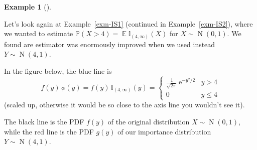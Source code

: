 \documentclass[
  letterpaper,
  DIV=11,
  numbers=noendperiod]{scrreprt}
\newcommand{\Exg}{\operatorname{\mathbb{E}}}
\newcommand{\Ind}{\mathbb{I}}
\theoremstyle{plain}
\theoremstyle{definition}
\theoremstyle{definition}
\newtheorem{example}{Example}[chapter]
\theoremstyle{remark}
\begin{document}
\begin{example}[]\protect\hypertarget{exm-IS3}{}\label{exm-IS3}

Let's look again at Example~\ref{exm-IS1} (continued in
Example~\ref{exm-IS2}), where we wanted to estimate
\(\mathbb P(X > 4) = \Exg\Ind_{(4,\infty)}(X)\) for
\(X \sim \operatorname{N}(0,1)\). We found are estimator was enormously
improved when we used instead \(Y \sim \operatorname{N}(4,1)\).

In the figure below, the blue line is
\[f(y)\,\phi(y) = f(y)\,\Ind_{(4,\infty)}(y) = \begin{cases} \displaystyle\frac{1}{\sqrt{2\pi}} \,\mathrm{e}^{-y^2/2} & y > 4 \\ 0 & y \leq 4 \end{cases} \]
(scaled up, otherwise it would be so close to the axis line you wouldn't
see it).

The black line is the PDF \(f(y)\) of the original distribution
\(X \sim \operatorname{N}(0,1)\), while the red line is the PDF \(g(y)\)
of our importance distribution \(Y \sim \operatorname{N}(4,1)\).


\end{example}
\end{document}
